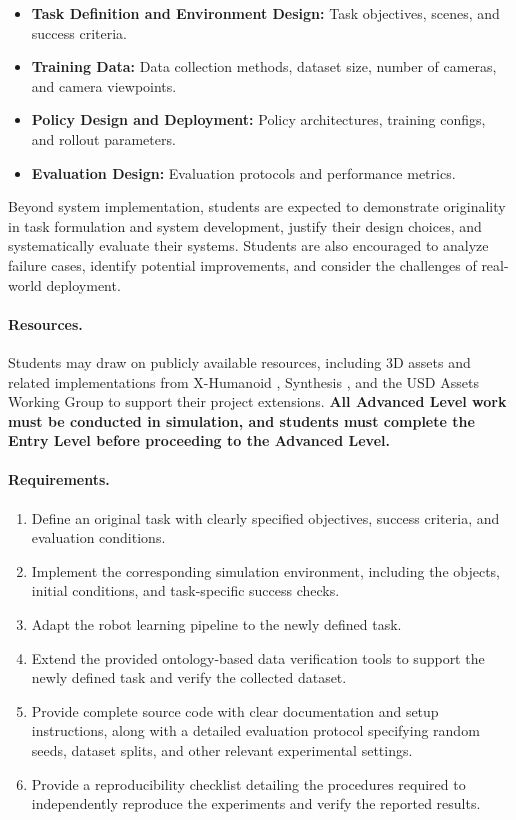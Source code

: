 \documentclass[11pt]{article}
\begin{document}
\begin{itemize}
  \item \textbf{Task Definition and Environment Design:} Task objectives, scenes, and success criteria.
  \item \textbf{Training Data:} Data collection methods, dataset size, number of cameras, and camera viewpoints.
  \item \textbf{Policy Design and Deployment:} Policy architectures, training configs, and rollout parameters.
  \item \textbf{Evaluation Design:} Evaluation protocols and performance metrics.
\end{itemize}

Beyond system implementation, students are expected to demonstrate originality in task formulation and system development, justify their design choices, and systematically evaluate their systems. Students are also encouraged to analyze failure cases, identify potential improvements, and consider the challenges of real-world deployment.

\paragraph{Resources.}

Students may draw on publicly available resources, including 3D assets and related implementations from X-Humanoid \cite{artvip_articulated_objects}, Synthesis \cite{synthesis}, and the USD Assets Working Group \cite{usd_assets_working_group} to support their project extensions. \textbf{All Advanced Level work must be conducted in simulation, and students must complete the Entry Level before proceeding to the Advanced Level.}

\paragraph{Requirements.}
\label{sec:advanced-requirements}

\begin{enumerate}
    \item Define an original task with clearly specified objectives, success criteria, and evaluation conditions.
    \item Implement the corresponding simulation environment, including the objects, initial conditions, and task-specific success checks.
    \item Adapt the robot learning pipeline to the newly defined task.
    \item Extend the provided ontology-based data verification tools to support the newly defined task and verify the collected dataset.
    \item Provide complete source code with clear documentation and setup instructions, along with a detailed evaluation protocol specifying random seeds, dataset splits, and other relevant experimental settings.
    \item Provide a reproducibility checklist detailing the procedures required to independently reproduce the experiments and verify the reported results.
\end{enumerate}
\end{document}
